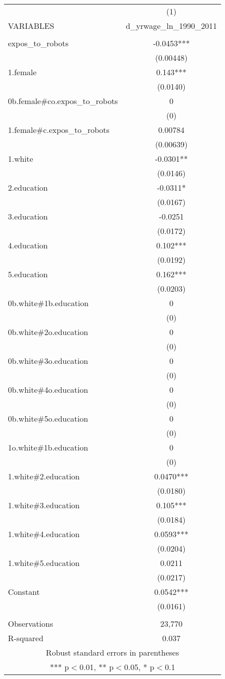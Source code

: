 \documentclass[]{article}
\begin{document}
\begin{tabular}{lc} \hline
 & (1) \\
VARIABLES & d\_yrwage\_ln\_1990\_2011 \\ \hline
 &  \\
expos\_to\_robots & -0.0453*** \\
 & (0.00448) \\
1.female & 0.143*** \\
 & (0.0140) \\
0b.female\#co.expos\_to\_robots & 0 \\
 & (0) \\
1.female\#c.expos\_to\_robots & 0.00784 \\
 & (0.00639) \\
1.white & -0.0301** \\
 & (0.0146) \\
2.education & -0.0311* \\
 & (0.0167) \\
3.education & -0.0251 \\
 & (0.0172) \\
4.education & 0.102*** \\
 & (0.0192) \\
5.education & 0.162*** \\
 & (0.0203) \\
0b.white\#1b.education & 0 \\
 & (0) \\
0b.white\#2o.education & 0 \\
 & (0) \\
0b.white\#3o.education & 0 \\
 & (0) \\
0b.white\#4o.education & 0 \\
 & (0) \\
0b.white\#5o.education & 0 \\
 & (0) \\
1o.white\#1b.education & 0 \\
 & (0) \\
1.white\#2.education & 0.0470*** \\
 & (0.0180) \\
1.white\#3.education & 0.105*** \\
 & (0.0184) \\
1.white\#4.education & 0.0593*** \\
 & (0.0204) \\
1.white\#5.education & 0.0211 \\
 & (0.0217) \\
Constant & 0.0542*** \\
 & (0.0161) \\
 &  \\
Observations & 23,770 \\
 R-squared & 0.037 \\ \hline
\multicolumn{2}{c}{ Robust standard errors in parentheses} \\
\multicolumn{2}{c}{ *** p$<$0.01, ** p$<$0.05, * p$<$0.1} \\
\end{tabular}
\end{document}
